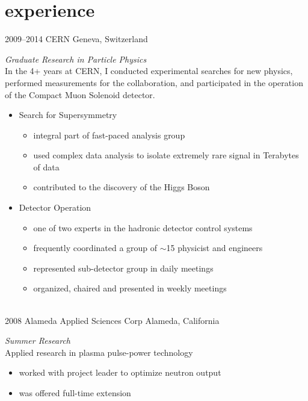 \documentclass[]{friggeri-cv} %
\begin{document}

\section{experience}

\begin{entrylist}
\entry
{2009--2014}
{CERN}
{Geneva, Switzerland}
{\emph{Graduate Research in Particle Physics} \\
In the 4+ years at CERN, I conducted experimental searches for new physics, 
performed measurements for the collaboration, and participated in the operation 
of the Compact Muon Solenoid detector.
\begin{itemize}
\item Search for Supersymmetry
\begin{itemize}
\item integral part of fast-paced analysis group
\item used complex data analysis to isolate extremely rare signal in Terabytes of data
\item contributed to the discovery of the Higgs Boson 
\end{itemize}
\item Detector Operation
\begin{itemize}
\item one of two experts in the hadronic detector control systems 
\item frequently coordinated a group of $\sim$15 physicist and engineers
\item represented sub-detector group in daily meetings
\item organized, chaired and presented in weekly meetings
\end{itemize}
\end{itemize}}
~~\\
\entry
{2008}
{Alameda Applied Sciences Corp}
{Alameda, California}
{\emph{Summer Research} \\
Applied research in plasma pulse-power technology
\begin{itemize}
\item worked with project leader to optimize neutron output
\item was offered full-time extension
\end{itemize}}
\end{entrylist}
\end{document}
